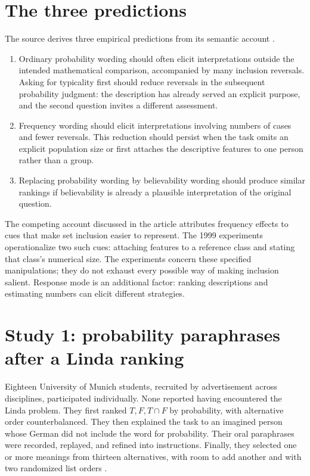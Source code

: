 \section{The three predictions}
\label{sec:p19-conjunction-language-predictions}

The source derives three empirical predictions from its semantic account
\cite[pp.~278--279]{HertwigGigerenzer1999Conjunction}.

\begin{enumerate}
\item Ordinary probability wording should often elicit interpretations
outside the intended mathematical comparison, accompanied by many
inclusion reversals. Asking for typicality first should reduce reversals
in the subsequent probability judgment: the description has already
served an explicit purpose, and the second question invites a different
assessment.
\item Frequency wording should elicit interpretations involving numbers
of cases and fewer reversals. This reduction should persist when the
task omits an explicit population size or first attaches the descriptive
features to one person rather than a group.
\item Replacing probability wording by believability wording should
produce similar rankings if believability is already a plausible
interpretation of the original question.
\end{enumerate}

The competing account discussed in the article attributes frequency
effects to cues that make set inclusion easier to represent.
The 1999 experiments operationalize two such cues: attaching features
to a reference class and stating that class's numerical size.
The experiments concern these specified manipulations; they do not
exhaust every possible way of making inclusion salient.
Response mode is an additional factor: ranking descriptions and
estimating numbers can elicit different strategies.

\section{Study 1: probability paraphrases after a Linda ranking}
\label{sec:p19-conjunction-language-study-one}

Eighteen University of Munich students, recruited by advertisement
across disciplines, participated individually. None reported having
encountered the Linda problem. They first ranked \(T,F,T\cap F\)
by probability, with alternative order counterbalanced. They then
explained the task to an imagined person whose German did not include
the word for probability. Their oral paraphrases were recorded,
replayed, and refined into instructions. Finally, they selected one
or more meanings from thirteen alternatives, with room to add another
and with two randomized list orders
\cite[pp.~279--283]{HertwigGigerenzer1999Conjunction}.

